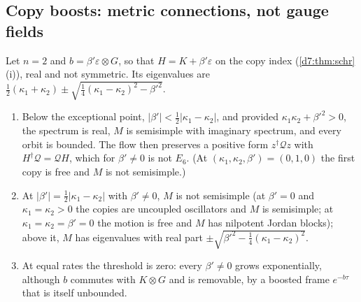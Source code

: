 \subsection{Copy boosts: metric connections, not gauge fields}
\label{d7:sec:boost}

\begin{proposition}
\label{d7:prop:boost}
Let $n=2$ and $b=\beta'\varepsilon\otimes G$, so that $H=K+\beta'\varepsilon$ on the copy index (\cref{d7:thm:schr}(i)), real and not symmetric. Its eigenvalues are
$\tfrac12(\kappa_1+\kappa_2)\pm\sqrt{\tfrac14(\kappa_1-\kappa_2)^2-\beta'^2}$.
\begin{enumerate}[label=(\roman*),leftmargin=2.2em]
\item Below the exceptional point, $|\beta'|<\tfrac12|\kappa_1-\kappa_2|$, and provided $\kappa_1\kappa_2+\beta'^2>0$, the spectrum is real, $M$ is semisimple with
imaginary spectrum, and every orbit is bounded. The flow then preserves a positive form $z^\dagger\mathcal Qz$ with $H^\dagger\mathcal Q=\mathcal QH$, which for
$\beta'\neq0$ is not $E_6$. (At $(\kappa_1,\kappa_2,\beta')=(0,1,0)$ the first copy is free and $M$ is not semisimple.)
\item At $|\beta'|=\tfrac12|\kappa_1-\kappa_2|$ with $\beta'\neq0$, $M$ is not semisimple (at $\beta'=0$ and $\kappa_1=\kappa_2>0$ the copies are uncoupled
oscillators and $M$ is semisimple; at $\kappa_1=\kappa_2=\beta'=0$ the motion is free and $M$ has nilpotent Jordan blocks); above it, $M$ has eigenvalues with real part $\pm\sqrt{\beta'^2-\tfrac14(\kappa_1-\kappa_2)^2}$.
\item At equal rates the threshold is zero: every $\beta'\neq0$ grows exponentially, although $b$ commutes with $K\otimes G$ and is removable, by a
boosted frame $e^{-b\tau}$ that is itself unbounded.
\end{enumerate}
\end{proposition}

